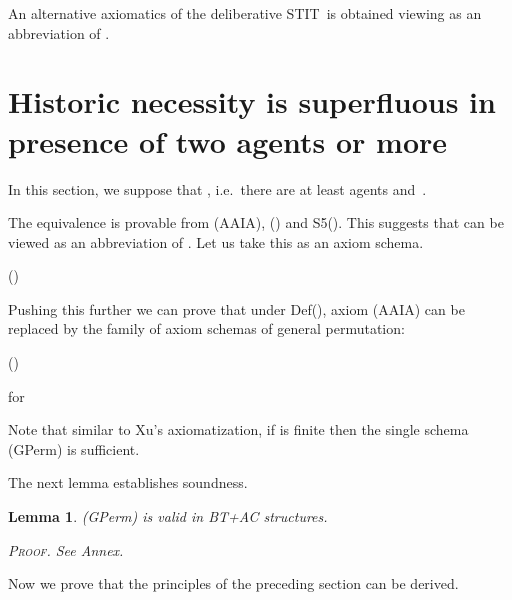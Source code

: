 \documentclass{article}
\newtheorem{lemma}{Lemma}
\newenvironment{pf}{\em \medskip\noindent \textsc{Proof.}}
{\hspace*{\fill}\nolinebreak[2]\hspace*{\fill}\medskip}
\newcommand{\InclBox}[1]{}
\newcommand{\STIT} {{\textsf{STIT}}}              \newcommand{\CSTIT}{{\textsf{CSTIT}}}            \newcommand{\DSTIT}{{\textsf{DSTIT}}}
\begin{document}
An alternative axiomatics of the deliberative \STIT\ is obtained viewing
 as an abbreviation of .



\goodbreak
\section{Historic necessity is superfluous
         in presence of two agents or more}\label{sec:unsettling}


In this section, we suppose that , i.e.\
there are at least agents  and~.

The equivalence 
is provable from (AAIA), (\InclBox{i}) and S5().
This suggests that  can be viewed as an abbreviation of
.
Let us take this as an axiom schema.

\begin{itemlist}{(\InclBox{i})}
  \item[Def()]
  
\end{itemlist}

Pushing this further we can prove that under Def(), axiom (AAIA) can be
replaced by the family of axiom schemas of general permutation:
\begin{itemlist}{(\InclBox{i})}
\item[(GPerm)]
    \hfill for 
\end{itemlist}
Note that similar to Xu's axiomatization, if  is finite then the single
schema (GPerm) is sufficient.

The next lemma establishes soundness.

\begin{lemma}\label{lem:validGperm}
(GPerm) is valid in BT+AC structures.

\begin{pf}
See Annex.
\end{pf}
\end{lemma}

Now we prove that the principles of the preceding section can be derived.
\end{document}
